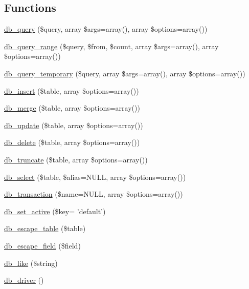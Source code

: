 \subsection*{Functions}
\begin{DoxyCompactItemize}
\item 
\hyperlink{group__database_gafa3b6cb2b2f61479cc63a4150c62da9b}{db\_\-query} (\$query, array \$args=array(), array \$options=array())
\item 
\hyperlink{group__database_gadd8bfb4984a4c69ac741b2bb20d6b9bf}{db\_\-query\_\-range} (\$query, \$from, \$count, array \$args=array(), array \$options=array())
\item 
\hyperlink{group__database_gaac717e09516a8acb0ff82b3a990c13a6}{db\_\-query\_\-temporary} (\$query, array \$args=array(), array \$options=array())
\item 
\hyperlink{group__database_gaadfbffaf30ff5eb14f1bd88619351345}{db\_\-insert} (\$table, array \$options=array())
\item 
\hyperlink{group__database_ga429c73a1bdc6dbb18c4a4a8a2235beaf}{db\_\-merge} (\$table, array \$options=array())
\item 
\hyperlink{group__database_ga40967197ee5d6a23a5c5a77e627067fe}{db\_\-update} (\$table, array \$options=array())
\item 
\hyperlink{group__database_ga72f0ccecc0ba181de16c6e3451150f2c}{db\_\-delete} (\$table, array \$options=array())
\item 
\hyperlink{group__database_gaf6b4b59f572821cfd043317b81eeb71e}{db\_\-truncate} (\$table, array \$options=array())
\item 
\hyperlink{group__database_ga9e030cee657d64e3d8e524c65814cc9f}{db\_\-select} (\$table, \$alias=NULL, array \$options=array())
\item 
\hyperlink{group__database_gabdd0e69f5b2c63f8ad9e76f0fdf552be}{db\_\-transaction} (\$name=NULL, array \$options=array())
\item 
\hyperlink{group__database_ga954d1bbb12742f285927e43f9489fdaf}{db\_\-set\_\-active} (\$key= 'default')
\item 
\hyperlink{group__database_ga3bc27db8c5946da0cab63d9b6314d48d}{db\_\-escape\_\-table} (\$table)
\item 
\hyperlink{group__database_ga7e3c82a45a3e894ce2b4a5a37fa69246}{db\_\-escape\_\-field} (\$field)
\item 
\hyperlink{group__database_ga4e86622a079f0992dbb987e66320be7a}{db\_\-like} (\$string)
\item 
\hyperlink{group__database_gabf958ef859f66154f7fd705eda7a06af}{db\_\-driver} ()

\end{DoxyCompactItemize}
